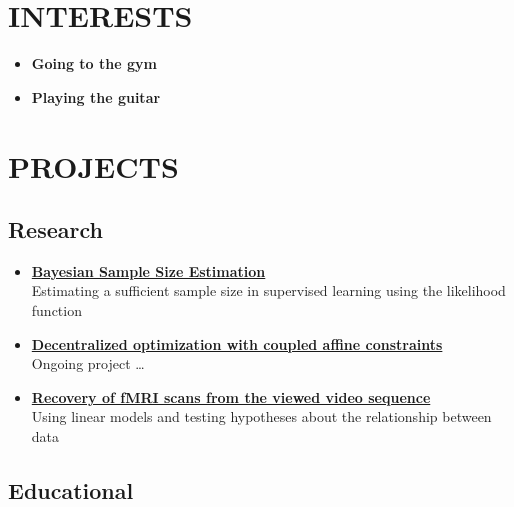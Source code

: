 \documentclass[12pt]{moderncv}
\begin{document}
    \section{INTERESTS}

        \begin{itemize}
            \item \textbf{Going to the gym}
            \item \textbf{Playing the guitar}
        \end{itemize}

    \section{PROJECTS}

        \subsection{Research}

        \begin{itemize}
            \item \href{https://github.com/kisnikser/Bayesian-Sample-Size-Estimation}{\textbf{Bayesian Sample Size Estimation}}\\
            Estimating a sufficient sample size in supervised learning using the likelihood function
            \item \href{https://github.com/kisnikser/Decentralized-Optimization}{\textbf{Decentralized optimization with coupled affine constraints}}\\
            Ongoing project \dots
            \item \href{https://github.com/intsystems/2023-Project-112}{\textbf{Recovery of fMRI scans from the viewed video sequence}}\\
            Using linear models and testing hypotheses about the relationship between data
        \end{itemize}

        \subsection{Educational}
\end{document}
